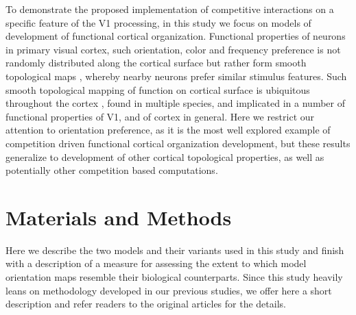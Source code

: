 \documentclass[utf8]{frontiersSCNS}
\begin{document}
To demonstrate the proposed implementation of competitive interactions on a specific feature of the V1 processing, in this study we focus on models of development of functional cortical organization. Functional properties of neurons in primary visual cortex, such orientation, color and frequency preference is not randomly distributed along the cortical surface but rather form smooth topological maps \citep{swindale:network96,goodhill:neuron07}, whereby nearby neurons prefer similar stimulus features. Such smooth topological mapping of function on cortical surface is ubiquitous throughout the cortex \citep{Huth2016}, found in multiple species, and implicated in a number of functional properties of V1, and of cortex in general. Here we restrict our attention to orientation preference, as it is the most well explored example of competition driven functional cortical organization development, but these results generalize to development of other cortical topological properties, as well as potentially other competition based computations.


\section{Materials and Methods}

Here we describe the two models and their variants used in this study and finish with a description of a measure
for assessing the extent to which model orientation maps resemble their biological counterparts. Since this study heavily leans on methodology 
developed in our previous studies, we offer here a short description and refer readers to the original articles for the details.
\end{document}
